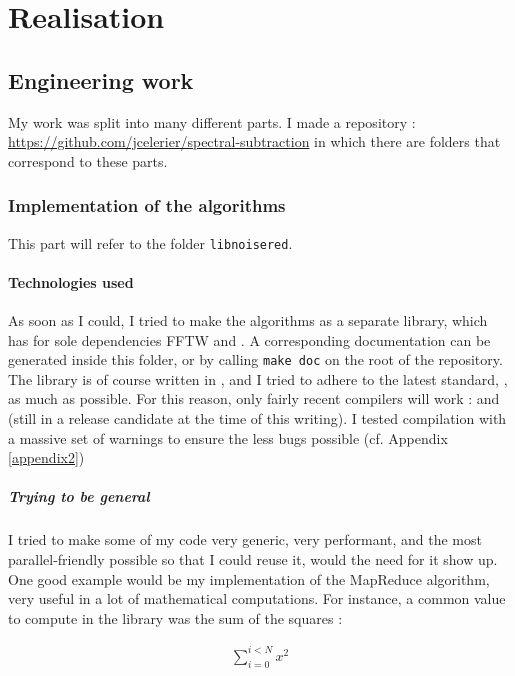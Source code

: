 \chapter{Realisation}
\section{Engineering work}
My work was split into many different parts. I made a  repository : \url{https://github.com/jcelerier/spectral-subtraction} in which there are folders that correspond to these parts.

\subsection{Implementation of the algorithms}
This part will refer to the folder \texttt{libnoisered}. 

\subsubsection{Technologies used}
As soon as I could, I tried to make the algorithms as a separate library, which has for sole dependencies \ac{FFTW} and . A corresponding  documentation can be generated inside this folder, or by calling \texttt{make doc} on the root of the repository.
The library is of course written in , and I tried to adhere to the latest standard, , as much as possible. For this reason, only fairly recent compilers will work :  and  (still in a release candidate at the time of this writing).
I tested compilation with a massive set of warnings to ensure the less bugs possible (cf. Appendix \ref{appendix2})

\paragraph{Trying to be general}
I tried to make some of my code very generic, very performant, and the most parallel-friendly possible so that I could reuse it, would the need for it show up.
One good example would be my implementation of the MapReduce algorithm, very useful in a lot of mathematical computations.
For instance, a common value to compute in the library was the sum of the squares : 

\begin{align*}
\displaystyle\sum_{\displaystyle i=0}^{\displaystyle i<N} \displaystyle x^2
\end{align*}

